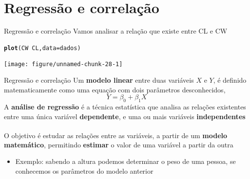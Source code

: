 \documentclass[10pt]{beamer}\usepackage[]{graphicx}\usepackage[]{color}
\makeatletter
\newcommand{\hlopt}[1]{\textcolor[rgb]{0,0,0}{#1}}%
\newcommand{\hlstd}[1]{\textcolor[rgb]{0.345,0.345,0.345}{#1}}%
\newcommand{\hlkwc}[1]{\textcolor[rgb]{0.333,0.667,0.333}{#1}}%
\newcommand{\hlkwd}[1]{\textcolor[rgb]{0.737,0.353,0.396}{\textbf{#1}}}%
\newenvironment{kframe}{%
 \def\at@end@of@kframe{}%
 \ifinner\ifhmode%
  \def\at@end@of@kframe{\end{minipage}}%
  \begin{minipage}{\columnwidth}%
 \fi\fi%
 \def\FrameCommand##1{\hskip\@totalleftmargin \hskip-\fboxsep
 \colorbox{shadecolor}{##1}\hskip-\fboxsep
     \hskip-\linewidth \hskip-\@totalleftmargin \hskip\columnwidth}%
 \MakeFramed {\advance\hsize-\width
   \@totalleftmargin\z@ \linewidth\hsize
   \@setminipage}}%
 {\par\unskip\endMakeFramed%
 \at@end@of@kframe}
\newenvironment{knitrout}{}{} %
\theoremstyle{definition}
\makeatother
\begin{document}
\section{Regressão e correlação}

\begin{frame}[fragile=singleslide]{Regressão e correlação}
Vamos analisar a relação que existe entre CL e CW
\begin{knitrout}\small
{}\color{fgcolor}\begin{kframe}
\begin{alltt}
\hlkwd{plot}\hlstd{(CW} \hlopt{~} \hlstd{CL,} \hlkwc{data} \hlstd{= dados)}
\end{alltt}
\end{kframe}

{\centering \texttt{[image: figure/unnamed-chunk-28-1]} 

}



\end{knitrout}
\end{frame}

\begin{frame}[fragile]{Regressão e correlação}
  Um \textbf{modelo linear} entre duas variáveis $X$ e $Y$, é definido
  matematicamente como uma equação com dois parâmetros desconhecidos,
  \begin{equation*}
    Y = \beta_0 + \beta_1 X
  \end{equation*}
  A \textbf{análise de regressão} é a técnica estatística que analisa as
  relações existentes entre uma única variável \textbf{dependente}, e
  uma ou mais variáveis \textbf{independentes} \\~\\
  O objetivo é estudar as relações entre as variáveis, a partir de um
  \textbf{modelo matemático}, permitindo \textbf{estimar} o valor de uma
  variável a partir da outra
  \begin{itemize}
  \item Exemplo: sabendo a altura podemos determinar o peso de uma
    pessoa, se conhecemos os parâmetros do modelo anterior
  \end{itemize}
\end{frame}
\end{document}
